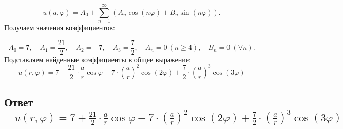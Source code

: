 \documentclass{article}
\begin{document}
$$
u(a, \varphi) = A_0 + \sum_{n=1}^\infty \left( A_n \cos(n\varphi) + B_n \sin(n\varphi) \right).
$$
Получаем значения коэффициентов:

$$
A_0 = 7,\quad A_1 = \frac{21}{2},\quad A_2 = -7,\quad A_3 = \frac{7}{2},\quad A_n = 0\ (n \geq 4),\quad B_n = 0\ (\forall n).
$$
Подставляем найденные коэффициенты в общее выражение:
$$
u(r, \varphi) = 7 + \frac{21}{2} \cdot \frac{a}{r} \cos\varphi - 7 \cdot \left( \frac{a}{r} \right)^2 \cos(2\varphi) + \frac{7}{2} \cdot \left( \frac{a}{r} \right)^3 \cos(3\varphi)
$$

\subsection*{Ответ $\quad u(r, \varphi) = 7 + \frac{21}{2} \cdot \frac{a}{r} \cos\varphi - 7 \cdot \left( \frac{a}{r} \right)^2 \cos(2\varphi) + \frac{7}{2} \cdot \left( \frac{a}{r} \right)^3 \cos(3\varphi)$}
\end{document}
